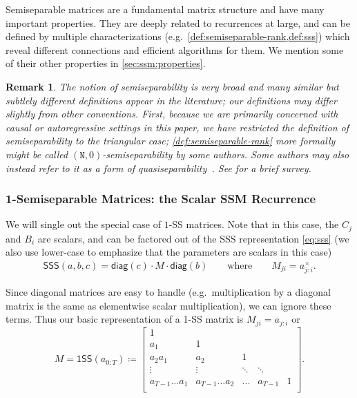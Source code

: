 \documentclass{article}
\newcommand{\citep}{\parencite}
\newcommand{\citet}{\textcite}
\newtheorem{remark}{Remark}
\begin{document}
Semiseparable matrices are a fundamental matrix structure and have many important properties.
They are deeply related to recurrences at large, and can be defined by multiple characterizations (e.g.\ \cref{def:semiseparable-rank,def:sss}) which reveal different connections and efficient algorithms for them.
We mention some of their other properties in \cref{sec:ssm:properties}.

\begin{remark}
  The notion of semiseparability is very broad and many similar but subtlely different definitions appear in the literature;
  our definitions may differ slightly from other conventions.
  First, because we are primarily concerned with causal or autoregressive settings in this paper,
  we have restricted the definition of semiseparability to the triangular case;
  \cref{def:semiseparable-rank} more formally might be called $(\mathtt{N},0)$-semiseparability by some authors.
  Some authors may also instead refer to it as a form of quasiseparability~\citep{eidelman1999new,pernet2016computing}.
  See \citet{vandebril2005bibliography} for a brief survey.
\end{remark}

\subsubsection{1-Semiseparable Matrices: the Scalar SSM Recurrence}
\label{sec:ssm:1-ss}

We will single out the special case of $1$-SS matrices.
Note that in this case, the $C_j$ and $B_i$ are scalars, and can be factored out of the SSS representation \eqref{eq:sss}
(we also use lower-case to emphasize that the parameters are scalars in this case)
\begin{align*}
  \mathsf{SSS}(a, b, c) = \mathsf{diag}(c) \cdot M \cdot \mathsf{diag}(b) \qquad \text{where} \qquad M_{ji} = a_{j:i}^\times
  .
\end{align*}

Since diagonal matrices are easy to handle (e.g.\ multiplication by a diagonal matrix is the same as elementwise scalar multiplication),
we can ignore these terms.
Thus our basic representation of a 1-SS matrix is $M_{ji} = a_{j:i}$ or
\begin{equation}
  \label{eq:1ss}
  M =
  \mathsf{1SS}(a_{0:T}) \coloneqq
  \begin{bmatrix}
    1 & \\
    a_1 & 1 & \\
    a_2a_1 & a_2 & 1 \\
    \vdots & \vdots & \ddots & \ddots \\
    a_{T-1}\dots a_1 & a_{T-1}\dots a_2 & \dots & a_{T-1} & 1 \\
  \end{bmatrix}
  .
\end{equation}
\end{document}
